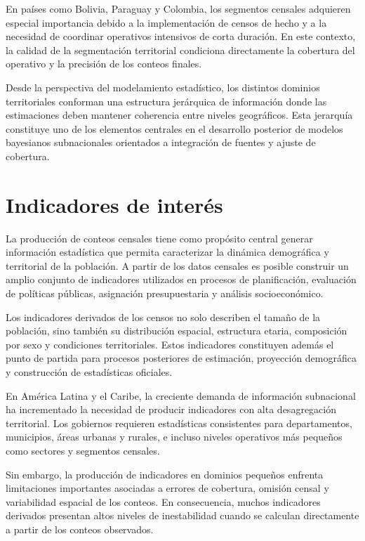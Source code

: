 \documentclass[
  spanish,
]{book}
\begin{document}
En países como Bolivia, Paraguay y Colombia, los segmentos censales adquieren especial importancia debido a la implementación de censos de hecho y a la necesidad de coordinar operativos intensivos de corta duración. En este contexto, la calidad de la segmentación territorial condiciona directamente la cobertura del operativo y la precisión de los conteos finales.

Desde la perspectiva del modelamiento estadístico, los distintos dominios territoriales conforman una estructura jerárquica de información donde las estimaciones deben mantener coherencia entre niveles geográficos. Esta jerarquía constituye uno de los elementos centrales en el desarrollo posterior de modelos bayesianos subnacionales orientados a integración de fuentes y ajuste de cobertura.

\section{Indicadores de interés}\label{indicadores-de-interuxe9s}

La producción de conteos censales tiene como propósito central generar información estadística que permita caracterizar la dinámica demográfica y territorial de la población. A partir de los datos censales es posible construir un amplio conjunto de indicadores utilizados en procesos de planificación, evaluación de políticas públicas, asignación presupuestaria y análisis socioeconómico.

Los indicadores derivados de los censos no solo describen el tamaño de la población, sino también su distribución espacial, estructura etaria, composición por sexo y condiciones territoriales. Estos indicadores constituyen además el punto de partida para procesos posteriores de estimación, proyección demográfica y construcción de estadísticas oficiales.

En América Latina y el Caribe, la creciente demanda de información subnacional ha incrementado la necesidad de producir indicadores con alta desagregación territorial. Los gobiernos requieren estadísticas consistentes para departamentos, municipios, áreas urbanas y rurales, e incluso niveles operativos más pequeños como sectores y segmentos censales.

Sin embargo, la producción de indicadores en dominios pequeños enfrenta limitaciones importantes asociadas a errores de cobertura, omisión censal y variabilidad espacial de los conteos. En consecuencia, muchos indicadores derivados presentan altos niveles de inestabilidad cuando se calculan directamente a partir de los conteos observados.
\end{document}
